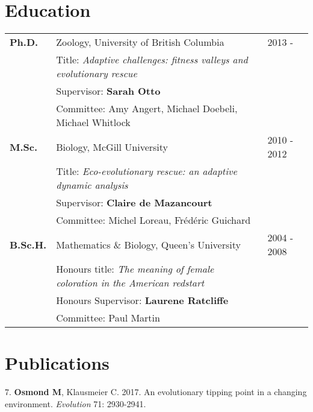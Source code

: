 \documentclass[12pt]{article}
\begin{document}

\section*{Education}

\begin{tabular}{lll}
\textbf{Ph.D.} & Zoology, University of British Columbia & 2013 - \\
& Title: \textit{Adaptive challenges: fitness valleys and evolutionary rescue}\\
& Supervisor: \textbf{Sarah Otto}\\
& Committee: Amy Angert, Michael Doebeli, Michael Whitlock\\
\textbf{M.Sc.} & Biology, McGill University & 2010 - 2012 \\
& Title: \textit{Eco-evolutionary rescue: an adaptive dynamic analysis}  \\
& Supervisor: \textbf{Claire de Mazancourt}\\
& Committee: Michel Loreau, Fr\'{e}d\'{e}ric Guichard\\
\textbf{B.Sc.H.} &  Mathematics \& Biology, Queen's University & 2004 - 2008\\ %
& Honours title: \textit{The meaning of female coloration in the American redstart}  \\
& Honours Supervisor: \textbf{Laurene Ratcliffe}\\
& Committee: Paul Martin\\
\end{tabular}

\section*{Publications}


\noindent\hspace{.1cm}7. \textbf{Osmond M}, Klausmeier C. 2017. An evolutionary tipping point in a changing environment. \textit{Evolution} 71: 2930-2941.
\end{document}
